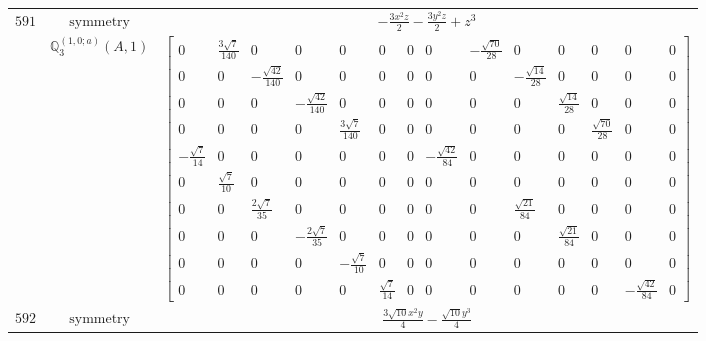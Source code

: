 \documentclass[fleqn,8pt,landscape]{jsarticle}
\begin{document}
\begin{longtable}{ccc}
$ 591 $ & $ \text{symmetry} $ & $ - \frac{3 x^{2} z}{2} - \frac{3 y^{2} z}{2} + z^{3} $ \\
$  $ & $ \mathbb{Q}_{3}^{(1,0;a)}(A,1) $ & $ \begin{bmatrix} 0 & \frac{3 \sqrt{7}}{140} & 0 & 0 & 0 & 0 & 0 & 0 & - \frac{\sqrt{70}}{28} & 0 & 0 & 0 & 0 & 0 \\ 0 & 0 & - \frac{\sqrt{42}}{140} & 0 & 0 & 0 & 0 & 0 & 0 & - \frac{\sqrt{14}}{28} & 0 & 0 & 0 & 0 \\ 0 & 0 & 0 & - \frac{\sqrt{42}}{140} & 0 & 0 & 0 & 0 & 0 & 0 & \frac{\sqrt{14}}{28} & 0 & 0 & 0 \\ 0 & 0 & 0 & 0 & \frac{3 \sqrt{7}}{140} & 0 & 0 & 0 & 0 & 0 & 0 & \frac{\sqrt{70}}{28} & 0 & 0 \\ - \frac{\sqrt{7}}{14} & 0 & 0 & 0 & 0 & 0 & 0 & - \frac{\sqrt{42}}{84} & 0 & 0 & 0 & 0 & 0 & 0 \\ 0 & \frac{\sqrt{7}}{10} & 0 & 0 & 0 & 0 & 0 & 0 & 0 & 0 & 0 & 0 & 0 & 0 \\ 0 & 0 & \frac{2 \sqrt{7}}{35} & 0 & 0 & 0 & 0 & 0 & 0 & \frac{\sqrt{21}}{84} & 0 & 0 & 0 & 0 \\ 0 & 0 & 0 & - \frac{2 \sqrt{7}}{35} & 0 & 0 & 0 & 0 & 0 & 0 & \frac{\sqrt{21}}{84} & 0 & 0 & 0 \\ 0 & 0 & 0 & 0 & - \frac{\sqrt{7}}{10} & 0 & 0 & 0 & 0 & 0 & 0 & 0 & 0 & 0 \\ 0 & 0 & 0 & 0 & 0 & \frac{\sqrt{7}}{14} & 0 & 0 & 0 & 0 & 0 & 0 & - \frac{\sqrt{42}}{84} & 0 \end{bmatrix} $ \\ \hline
$ 592 $ & $ \text{symmetry} $ & $ \frac{3 \sqrt{10} x^{2} y}{4} - \frac{\sqrt{10} y^{3}}{4} $ \\

\end{longtable}
\end{document}
